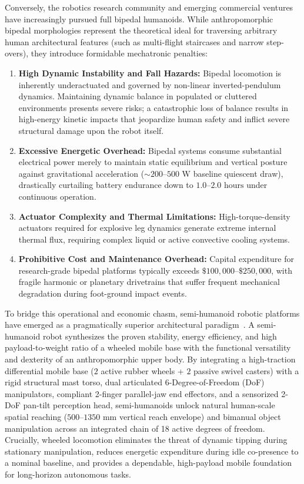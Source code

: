 Conversely, the robotics research community and emerging commercial ventures have increasingly pursued full bipedal humanoids. While anthropomorphic bipedal morphologies represent the theoretical ideal for traversing arbitrary human architectural features (such as multi-flight staircases and narrow step-overs), they introduce formidable mechatronic penalties:
\begin{enumerate}[leftmargin=1.5em]
  \item \textbf{High Dynamic Instability and Fall Hazards:} Bipedal locomotion is inherently underactuated and governed by non-linear inverted-pendulum dynamics. Maintaining dynamic balance in populated or cluttered environments presents severe risks; a catastrophic loss of balance results in high-energy kinetic impacts that jeopardize human safety and inflict severe structural damage upon the robot itself.
  \item \textbf{Excessive Energetic Overhead:} Bipedal systems consume substantial electrical power merely to maintain static equilibrium and vertical posture against gravitational acceleration ($\sim 200\text{--}500\text{ W}$ baseline quiescent draw), drastically curtailing battery endurance down to $1.0\text{--}2.0\text{ hours}$ under continuous operation.
  \item \textbf{Actuator Complexity and Thermal Limitations:} High-torque-density actuators required for explosive leg dynamics generate extreme internal thermal flux, requiring complex liquid or active convective cooling systems.
  \item \textbf{Prohibitive Cost and Maintenance Overhead:} Capital expenditure for research-grade bipedal platforms typically exceeds $\$100{,}000\text{--}\$250{,}000$, with fragile harmonic or planetary drivetrains that suffer frequent mechanical degradation during foot-ground impact events.
\end{enumerate}

To bridge this operational and economic chasm, semi-humanoid robotic platforms have emerged as a pragmatically superior architectural paradigm~\cite{stretch,mobilealoha,tiagopro,reachy2}. A semi-humanoid robot synthesizes the proven stability, energy efficiency, and high payload-to-weight ratio of a wheeled mobile base with the functional versatility and dexterity of an anthropomorphic upper body. By integrating a high-traction differential mobile base ($2$ active rubber wheels + $2$ passive swivel casters) with a rigid structural mast torso, dual articulated 6-Degree-of-Freedom (DoF) manipulators, compliant 2-finger parallel-jaw end effectors, and a sensorized 2-DoF pan-tilt perception head, semi-humanoids unlock natural human-scale spatial reaching ($500\text{--}1350\text{ mm}$ vertical reach envelope) and bimanual object manipulation across an integrated chain of 18 active degrees of freedom. Crucially, wheeled locomotion eliminates the threat of dynamic tipping during stationary manipulation, reduces energetic expenditure during idle co-presence to a nominal baseline, and provides a dependable, high-payload mobile foundation for long-horizon autonomous tasks.

